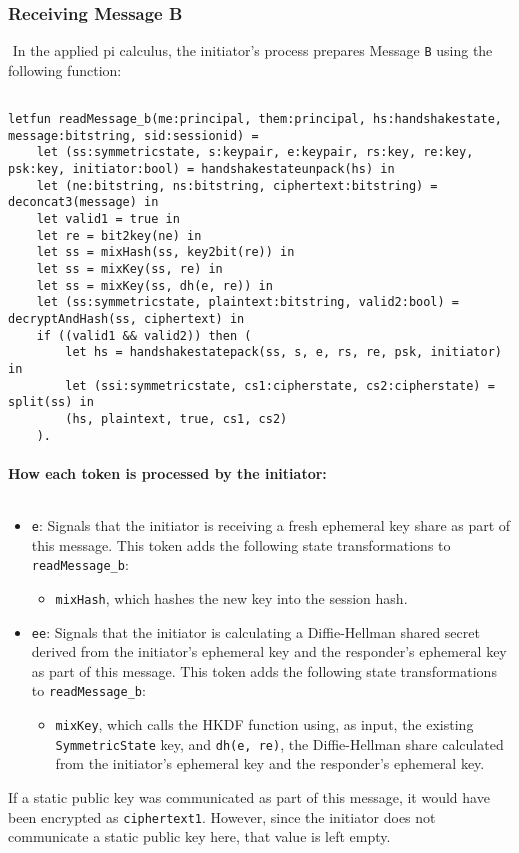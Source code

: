 \subsubsection{Receiving Message B}$ $
In the applied pi calculus, the initiator's process prepares Message \texttt{B} using the following function:


\begin{lstlisting}

letfun readMessage_b(me:principal, them:principal, hs:handshakestate, message:bitstring, sid:sessionid) =
	let (ss:symmetricstate, s:keypair, e:keypair, rs:key, re:key, psk:key, initiator:bool) = handshakestateunpack(hs) in
	let (ne:bitstring, ns:bitstring, ciphertext:bitstring) = deconcat3(message) in
	let valid1 = true in
	let re = bit2key(ne) in
	let ss = mixHash(ss, key2bit(re)) in
	let ss = mixKey(ss, re) in
	let ss = mixKey(ss, dh(e, re)) in
	let (ss:symmetricstate, plaintext:bitstring, valid2:bool) = decryptAndHash(ss, ciphertext) in
	if ((valid1 && valid2)) then (
		let hs = handshakestatepack(ss, s, e, rs, re, psk, initiator) in
		let (ssi:symmetricstate, cs1:cipherstate, cs2:cipherstate) = split(ss) in
		(hs, plaintext, true, cs1, cs2)
	).

\end{lstlisting}

\paragraph{How each token is processed by the initiator:}$ $

\begin{itemize}

\item \texttt{e}: Signals that the initiator is receiving a fresh ephemeral key share as part of this message. This token adds the following state transformations to \texttt{readMessage\_b}:
\begin{itemize}

\item \texttt{mixHash}, which hashes the new key into the session hash.
\end{itemize}


\item \texttt{ee}: Signals that the initiator is calculating a Diffie-Hellman shared secret derived from the initiator's ephemeral key and the responder's ephemeral key as part of this message. This token adds the following state transformations to \texttt{readMessage\_b}:
\begin{itemize}

\item \texttt{mixKey}, which calls the HKDF function using, as input, the existing \texttt{SymmetricState} key, and \texttt{dh(e, re)}, the Diffie-Hellman share calculated from the initiator's ephemeral key and the responder's ephemeral key.
\end{itemize}


\end{itemize}
If a static public key was communicated as part of this message, it would have been encrypted as \texttt{ciphertext1}. However, since the initiator does not communicate a static public key here, that value is left empty.


